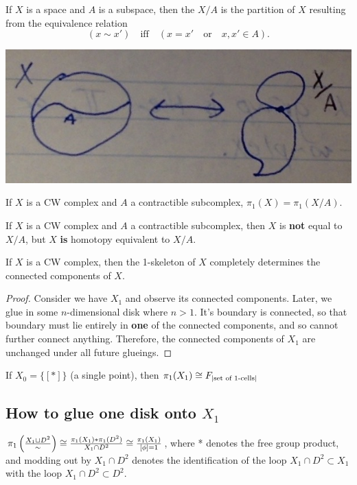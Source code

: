 \documentclass[11pt,leqno,oneside]{amsart}
\numberwithin{thm}{section}
\newcommand{\fund}[1][1]{\pi_{#1}}
\begin{document}
\begin{defn}
  If $X$ is a space and $A$ is a subspace, then the  $X/A$ is the partition of $X$ resulting from the equivalence relation $$(x \sim x') \quad \text{iff} \quad (x = x' \quad \text{or} \quad x, x' \in A).$$
\end{defn}
\begin{example}
  \includegraphics[scale=0.2]{images/quotient-space}
\end{example}
\begin{thm}
  If $X$ is a CW complex and $A$ a contractible subcomplex, $\fund(X) = \fund(X/A)$.
\end{thm}
\begin{rmk}
  If $X$ is a CW complex and $A$ a contractible subcomplex, then $X$ is \textbf{not} equal to $X/A$, but $X$ \textbf{is} homotopy equivalent to $X/A$.
\end{rmk}
\begin{thm}
  If $X$ is a CW complex, then the 1-skeleton of $X$ completely determines the connected components of $X$.
\end{thm}
\begin{proof}
  Consider we have $X_1$ and observe its connected components.  Later, we glue in some $n$-dimensional disk where $n > 1$. It's boundary is connected, so that boundary must lie entirely in \textbf{one} of the connected components, and so cannot further connect anything.  Therefore, the connected components of $X_1$ are unchanged under all future glueings.
\end{proof}

If $X_0 = \{[*]\}$ (a single point), then $\fund(X_1) \isom F_{|\text{set of 1-cells}|}$

\subsection{How to glue one disk onto $X_1$}

$\fund\left( \frac{X_1 \dunion D^2}{\sim} \right) \isom \frac{\fund(X_1) * \fund(D^2)}{X_1 \cap D^2} \isom \frac{\fund(X_1)}{[\phi] = 1}$, where * denotes the free group product, and modding out by $X_1 \cap D^2$ denotes the identification of the loop $X_1 \cap D^2 \subset X_1$ with the loop $X_1 \cap D^2 \subset D^2$.
\end{document}
